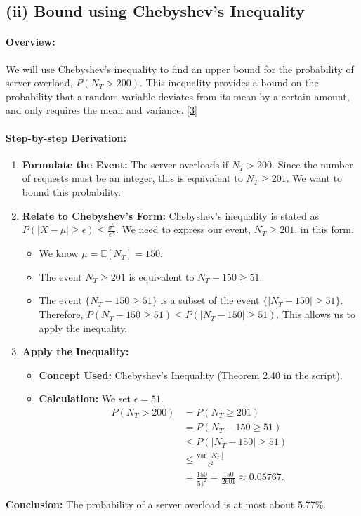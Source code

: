 \documentclass[11pt,a4paper]{article}
\begin{document}
\subsection{(ii) Bound using Chebyshev's Inequality}

\paragraph{Overview:}
We will use Chebyshev's inequality to find an upper bound for the probability of server overload, $P(N_T > 200)$. This inequality provides a bound on the probability that a random variable deviates from its mean by a certain amount, and only requires the mean and variance.
\hyperlink{concept3}{[3]}

\paragraph{Step-by-step Derivation:}
\begin{enumerate}
    \item \textbf{Formulate the Event:} The server overloads if $N_T > 200$. Since the number of requests must be an integer, this is equivalent to $N_T \geq 201$. We want to bound this probability.

    \item \textbf{Relate to Chebyshev's Form:} Chebyshev's inequality is stated as $P(|X - \mu| \geq \epsilon) \leq \frac{\sigma^2}{\epsilon^2}$. We need to express our event, $N_T \geq 201$, in this form.
    \begin{itemize}
        \item We know $\mu = \mathbb{E}[N_T] = 150$.
        \item The event $N_T \geq 201$ is equivalent to $N_T - 150 \geq 51$.
        \item The event $\{N_T - 150 \geq 51\}$ is a subset of the event $\{|N_T - 150| \geq 51\}$. Therefore, $P(N_T - 150 \geq 51) \leq P(|N_T - 150| \geq 51)$. This allows us to apply the inequality.
    \end{itemize}

    \item \textbf{Apply the Inequality:}
    \begin{itemize}
        \item \textbf{Concept Used:} Chebyshev's Inequality (Theorem 2.40 in the script).
        \item \textbf{Calculation:} We set $\epsilon = 51$.
        \begin{align*}
            P(N_T > 200) &= P(N_T \geq 201) \\
            &= P(N_T - 150 \geq 51) \\
            &\leq P(|N_T - 150| \geq 51) \\
            &\leq \frac{\text{var}[N_T]}{\epsilon^2} \\
            &= \frac{150}{51^2} = \frac{150}{2601} \approx 0.05767.
        \end{align*}
    \end{itemize}
\end{enumerate}
\textbf{Conclusion:} The probability of a server overload is at most about 5.77\%.
\end{document}
